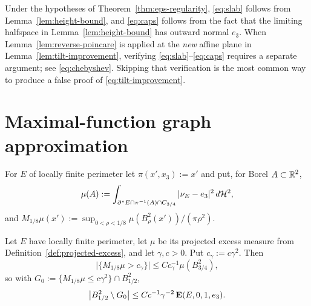\begin{remark}
\label{rem:slab-supplied}
Under the hypotheses of Theorem~\ref{thm:eps-regularity},
\eqref{eq:slab} follows from Lemma~\ref{lem:height-bound}, and
\eqref{eq:caps} follows from the fact that the limiting halfspace in
Lemma~\ref{lem:height-bound} has outward normal $e_3$.  When
Lemma~\ref{lem:reverse-poincare} is applied at the \emph{new} affine plane in
Lemma~\ref{lem:tilt-improvement}, verifying \eqref{eq:slab}--\eqref{eq:caps}
requires a separate argument; see \eqref{eq:chebyshev}.  Skipping that
verification is the most common way to produce a false proof of
\eqref{eq:tilt-improvement}.
\end{remark}

\section{Maximal-function graph approximation}\label{sec:graph-approx}

\begin{definition}
\label{def:projected-excess}
For $E$ of locally finite perimeter let $\pi(x',x_3):=x'$ and put, for Borel
$A\subset\mathbb R^2$,
\begin{equation}\label{eq:projected-excess}
  \mu(A):=\int_{\partial^* E\cap\pi^{-1}(A)\cap C_{3/4}}|\nu_E-e_3|^2\,d\mathcal H^2 ,
\end{equation}
and $M_{1/8}\mu(x'):=\sup_{0<\rho<1/8}\mu(B^2_\rho(x'))/(\pi\rho^2)$.
\end{definition}

\begin{lemma}\label{lem:good-base}
Let $E$ have locally finite perimeter, let $\mu$ be its projected excess
measure from Definition~\ref{def:projected-excess}, and let $\gamma,c>0$.
Put $c_\gamma:=c\gamma^2$.  Then
\begin{equation}\label{eq:good-base-measure}
  \bigl|\{M_{1/8}\mu>c_\gamma\}\bigr|\le Cc_\gamma^{-1}\mu(B^2_{3/4}),
\end{equation}
so with $G_0:=\{M_{1/8}\mu\le c\gamma^2\}\cap B^2_{1/2}$,
\begin{equation}\label{eq:good-base-complement}
  \bigl|B^2_{1/2}\setminus G_0\bigr|
  \le Cc^{-1}\gamma^{-2}\operatorname{\mathbf E}(E,0,1,e_3).
\end{equation}
\end{lemma}


